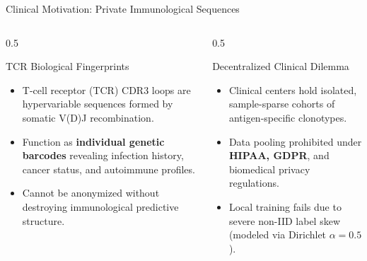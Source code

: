\documentclass[aspectratio=169,10pt]{beamer}
\begin{document}
\begin{frame}{Clinical Motivation: Private Immunological Sequences}
  \begin{columns}[T]
    \begin{column}{0.5\textwidth}
      \begin{block}{TCR Biological Fingerprints}
        \begin{itemize}[itemsep=4pt]
          \item T-cell receptor (TCR) CDR3 loops are hypervariable sequences formed by somatic V(D)J recombination.
          \item Function as \textbf{individual genetic barcodes} revealing infection history, cancer status, and autoimmune profiles.
          \item Cannot be anonymized without destroying immunological predictive structure.
        \end{itemize}
      \end{block}
    \end{column}
    \begin{column}{0.5\textwidth}
      \begin{block}{Decentralized Clinical Dilemma}
        \begin{itemize}[itemsep=4pt]
          \item Clinical centers hold isolated, sample-sparse cohorts of antigen-specific clonotypes.
          \item Data pooling prohibited under \textbf{HIPAA, GDPR}, and biomedical privacy regulations.
          \item Local training fails due to severe non-IID label skew (modeled via Dirichlet $\alpha = 0.5$).
        \end{itemize}
      \end{block}
    \end{column}
  \end{columns}
\end{frame}
\end{document}
